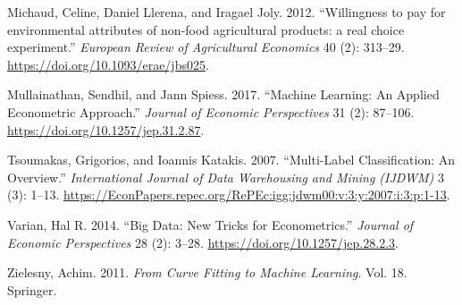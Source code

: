 \documentclass[11pt,]{article}
\begin{document}
\leavevmode\hypertarget{ref-llerena2013rose}{}%
Michaud, Celine, Daniel Llerena, and Iragael Joly. 2012. ``Willingness
to pay for environmental attributes of non-food agricultural products: a
real choice experiment.'' \emph{European Review of Agricultural
Economics} 40 (2): 313--29. \url{https://doi.org/10.1093/erae/jbs025}.

\leavevmode\hypertarget{ref-mullainathan2017ml}{}%
Mullainathan, Sendhil, and Jann Spiess. 2017. ``Machine Learning: An
Applied Econometric Approach.'' \emph{Journal of Economic Perspectives}
31 (2): 87--106. \url{https://doi.org/10.1257/jep.31.2.87}.

\leavevmode\hypertarget{ref-tsoumakas2007cm}{}%
Tsoumakas, Grigorios, and Ioannis Katakis. 2007. ``Multi-Label
Classification: An Overview.'' \emph{International Journal of Data
Warehousing and Mining (IJDWM)} 3 (3): 1--13.
\url{https://EconPapers.repec.org/RePEc:igg:jdwm00:v:3:y:2007:i:3:p:1-13}.

\leavevmode\hypertarget{ref-varian2014bd}{}%
Varian, Hal R. 2014. ``Big Data: New Tricks for Econometrics.''
\emph{Journal of Economic Perspectives} 28 (2): 3--28.
\url{https://doi.org/10.1257/jep.28.2.3}.

\leavevmode\hypertarget{ref-zielesny2011cf}{}%
Zielesny, Achim. 2011. \emph{From Curve Fitting to Machine Learning}.
Vol. 18. Springer.
\end{document}
